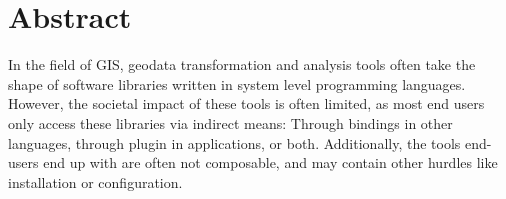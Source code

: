 \chapter*{Abstract}

In the field of \ac{GIS}, geodata transformation and analysis tools often take the shape of software libraries written in system level programming languages. 
However, the societal impact of these tools is often limited, as most end users only access these libraries via indirect means: Through bindings in other languages, through plugin in applications, or both. 
Additionally, the tools end-users end up with are often not composable, and may contain other hurdles like installation or configuration. 

